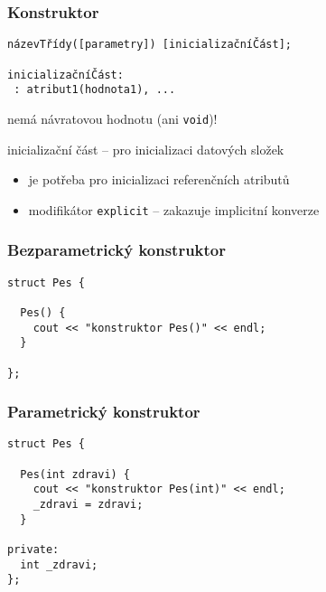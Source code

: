 \begin{frame}[fragile]
\frametitle{Konstruktor}
\begin{noteblock}{}
\begin{lstlisting}
názevTřídy([parametry]) [inicializačníČást];

inicializačníČást:
 : atribut1(hodnota1), ...
\end{lstlisting}
\end{noteblock}

\begin{bitemize}
\item nemá návratovou hodnotu (ani \lstinline|void|)!
\item inicializační část -- pro inicializaci datových složek
\begin{itemize}
\item je potřeba pro inicializaci referenčních atributů
\end{itemize}
\end{bitemize}

\begin{bonusblock}{}
\begin{itemize}
\item modifikátor \lstinline|explicit| -- zakazuje implicitní konverze
\end{itemize}
\end{bonusblock}
\end{frame}


\begin{frame}[fragile]
\frametitle{Bezparametrický konstruktor}
\begin{yesblock}
\begin{lstlisting}
struct Pes {

  Pes() {
    cout << "konstruktor Pes()" << endl;
  }

};
\end{lstlisting}
\end{yesblock}
\end{frame}


\begin{frame}[fragile]
\frametitle{Parametrický konstruktor}
\begin{yesblock}
\begin{lstlisting}
struct Pes {

  Pes(int zdravi) {
    cout << "konstruktor Pes(int)" << endl;
    _zdravi = zdravi;
  }

private:
  int _zdravi;
};
\end{lstlisting}
\end{yesblock}
\end{frame}




